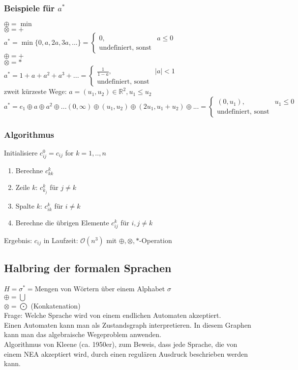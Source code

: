 \subsubsection{Beispiele für $a^*$}
$\oplus = \min$\\
$\otimes = +$\\
$a^* = \min \{0, a, 2a, 3a,... \} = \begin{cases}0, &a\leq 0 \\ \text{undefiniert, sonst} \end{cases}$\\
$\oplus = +$\\
$\otimes = *$\\
$a^* = 1 + a + a^2 + a^3 + ... = \begin{cases} \frac{1}{1-a}, &|a|< 1 \\ \text{undefiniert, sonst} \end{cases}$\\
zweit kürzeste Wege:
$a = (u_1,u_2) \in \mathbb{R}^2, u_1 \leq u_2$\\
$a^* = e_1 \oplus a \oplus a^2 \oplus ... (0,\infty) \oplus (u_1,u_2) \oplus (2u_1, u_1 + u_2) \oplus ...  = \begin{cases} (0,u_1), & u_1 \leq 0 \\ \text{undefiniert, sonst} \end{cases}$\\

\subsubsection{Algorithmus}
Initialisiere $c_{ij}^0 = c_{ij}$
for $k=1,..,n$
\begin{enumerate}
\item Berechne $c_{kk}^k$
\item Zeile $k$: $c_{k_j}^k$ für $j\neq k$
\item Spalte $k$: $c_{ik}^k$ für $i\neq k$
\item Berechne die übrigen Elemente $c_{ij}^k$ für $i,j \neq k$
\end{enumerate}
Ergebnis: $c_{ij}$ in Laufzeit: $\mathcal{O}(n^3)$ mit $\oplus, \otimes, *$-Operation

\subsection{Halbring der formalen Sprachen}
$H = \sigma^* = $Mengen von Wörtern über einem Alphabet $\sigma$\\
$\oplus = \bigcup$\\
$\otimes = \bigodot$ (Konkatenation)\\
Frage: Welche Sprache wird von einem endlichen Automaten akzeptiert.\\
Einen Automaten kann man als Zustandsgraph interpretieren. In diesem Graphen kann man das algebraische Wegeproblem anwenden.\\
Algorithmus von Kleene (ca. 1950er), zum Beweis, dass jede Sprache, die von einem NEA akzeptiert wird, durch einen regulären Ausdruck beschrieben werden kann.\\